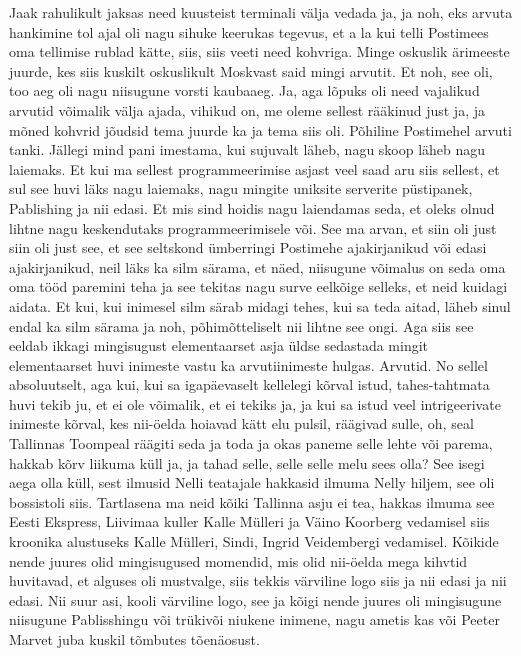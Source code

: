 Jaak rahulikult jaksas need kuusteist terminali välja vedada ja, ja noh, eks arvuta hankimine tol ajal oli nagu sihuke keerukas tegevus, et a la kui telli Postimees oma tellimise rublad kätte, siis, siis veeti need kohvriga. Minge oskuslik ärimeeste juurde, kes siis kuskilt oskuslikult Moskvast said mingi arvutit. Et noh, see oli, too aeg oli nagu niisugune vorsti kaubaaeg. Ja, aga lõpuks oli need vajalikud arvutid võimalik välja ajada, vihikud on, me oleme sellest rääkinud just ja, ja mõned kohvrid jõudsid tema juurde ka ja tema siis oli.
Põhiline Postimehel arvuti tanki.
Jällegi mind pani imestama, kui sujuvalt läheb, nagu skoop läheb nagu laiemaks. Et kui ma sellest programmeerimise asjast veel saad aru siis sellest, et sul see huvi läks nagu laiemaks, nagu mingite uniksite serverite püstipanek, Pablishing ja nii edasi. Et mis sind hoidis nagu laiendamas seda, et oleks olnud lihtne nagu keskendutaks programmeerimisele või.
See ma arvan, et siin oli just siin oli just see, et see seltskond ümberringi
Postimehe ajakirjanikud või edasi ajakirjanikud, neil läks ka silm särama, et näed, niisugune võimalus on seda oma oma tööd paremini teha ja see tekitas nagu surve eelkõige selleks, et neid kuidagi aidata. Et kui, kui inimesel silm särab midagi tehes, kui sa teda aitad, läheb sinul endal ka silm särama ja noh, põhimõtteliselt nii lihtne see ongi.
Aga siis see eeldab ikkagi mingisugust elementaarset asja üldse sedastada mingit elementaarset huvi inimeste vastu ka arvutiinimeste hulgas. Arvutid.
No sellel absoluutselt, aga kui, kui sa igapäevaselt kellelegi kõrval istud, tahes-tahtmata huvi tekib ju, et ei ole võimalik, et ei tekiks ja, ja kui sa istud veel intrigeerivate inimeste kõrval, kes nii-öelda hoiavad kätt elu pulsil, räägivad sulle, oh, seal Tallinnas Toompeal räägiti seda ja toda ja okas paneme selle lehte või parema, hakkab kõrv liikuma küll ja, ja tahad selle, selle selle melu sees olla?
See isegi aega olla küll, sest ilmusid Nelli teatajale hakkasid ilmuma Nelly hiljem, see oli bossistoli siis.
Tartlasena ma neid kõiki Tallinna asju ei tea, hakkas ilmuma see Eesti Ekspress, Liivimaa kuller Kalle Mülleri ja Väino Koorberg vedamisel siis kroonika alustuseks Kalle Mülleri, Sindi, Ingrid Veidembergi vedamisel. Kõikide nende juures olid mingisugused momendid, mis olid nii-öelda mega kihvtid huvitavad, et alguses oli mustvalge, siis tekkis värviline logo siis ja nii edasi ja nii edasi.
Nii suur asi, kooli värviline logo, see ja kõigi nende juures oli mingisugune niisugune Pablisshingu või trükivõi niukene inimene, nagu ametis kas või Peeter Marvet juba kuskil tõmbutes tõenäosust.
